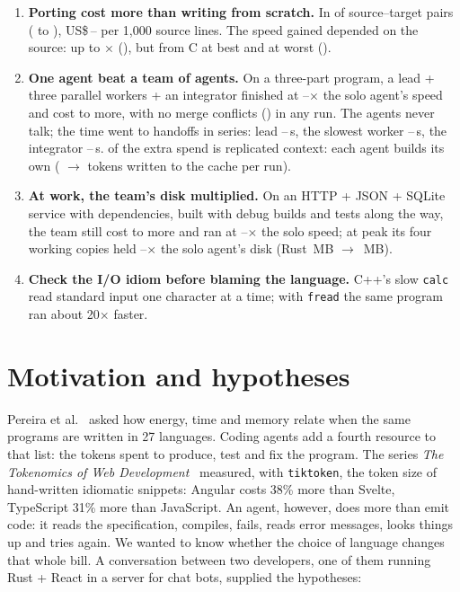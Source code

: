 \documentclass[11pt,a4paper]{article}
\begin{document}
\begin{enumerate}[leftmargin=1.4em]
        (\SkillDeltaZig).
  \item \textbf{Porting cost more than writing from scratch.} In \NPortCostlier{} of \NPortPairs{}
        source--target pairs (\PortDeltaMin{} to \PortDeltaMax), US\$\,\PortPerKMin--\PortPerKMax{} per
        1,000 source lines. The speed gained depended on the source: up to \PortSpeedMax$\times$
        (\PortSpeedMaxPair), but from C at best \PortBestC{} and at worst \PortWorstC{} (\PortWorstTargetC).
  \item \textbf{One agent beat a team of agents.} On a three-part program, a lead + three parallel workers
        + an integrator finished at \SwarmSpeedMin--\SwarmSpeedMax$\times$ the solo agent's speed and cost
        \SwarmCostMin{} to \SwarmCostMax{} more, with no merge conflicts (\SwarmConflicts) in any run. The
        agents never talk; the time went to handoffs in series: lead \SwarmLeadMin--\SwarmLeadMax\,s, the
        slowest worker \SwarmWorkerMin--\SwarmWorkerMax\,s, the integrator
        \SwarmIntegrateMin--\SwarmIntegrateMax\,s. \SwarmShareContext{} of the extra spend is replicated
        context: each agent builds its own (\SwarmCacheWriteBase{} $\to$ \SwarmCacheWriteArm{} tokens written
        to the cache per run).
  \item \textbf{At work, the team's disk multiplied.} On an HTTP + JSON + SQLite service with dependencies,
        built with debug builds and tests along the way, the team still cost \NotesCostMin{} to
        \NotesCostMax{} more and ran at \NotesSpeedMin--\NotesSpeedMax$\times$ the solo speed; at peak its
        four working copies held \NotesDiskMin--\NotesDiskMax$\times$ the solo agent's disk (Rust
        \NotesPeakSoloRust\,MB $\to$ \NotesPeakTeamRust\,MB).
  \item \textbf{Check the I/O idiom before blaming the language.} C++'s slow \texttt{calc} read standard
        input one character at a time; with \texttt{fread} the same program ran about 20$\times$ faster.
\end{enumerate}

\section{Motivation and hypotheses}

Pereira et al.~\cite{pereira2017} asked how energy, time and memory relate when the same programs
are written in 27 languages. Coding agents add a fourth resource to that list: the tokens spent to
produce, test and fix the program. The series \emph{The Tokenomics of Web
Development}~\cite{tokenomics1,tokenomics2} measured, with \texttt{tiktoken}, the token size of
hand-written idiomatic snippets: Angular costs 38\% more than Svelte,
TypeScript 31\% more than JavaScript. An agent, however, does more than emit code: it reads the
specification, compiles, fails, reads error messages, looks things up and tries again. We wanted to know
whether the choice of language changes that whole bill. A conversation between two developers, one of
them running Rust + React in a server for chat bots, supplied the hypotheses:
\end{document}
